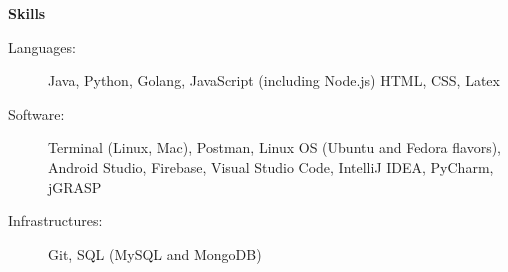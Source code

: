 \documentclass[letterpaper,11pt]{article}
\makeatletter
\newcommand{\resitem}[1]{\item #1 \vspace{-2pt}}
\newcommand{\resheading}[1]{{\large \colorbox{mygrey}{\begin{minipage}{\textwidth}{\textbf{#1 \vphantom{p\^{E}}}}\end{minipage}}}}
\newcommand{\ressubheading}[4]{
\begin{tabular*}{7.0in}{l@{\extracolsep{\fill}}r}
		\textbf{#1} & #2 \\
		\textit{#3} & \textit{#4} \\
\end{tabular*}\vspace{-6pt}}
\makeatother
\begin{document}

\resheading{Skills}

\begin{description}
\item[Languages:] Java, Python, Golang, JavaScript (including Node.js) HTML, CSS, Latex %
\item[Software:] Terminal (Linux, Mac), Postman, Linux OS (Ubuntu and Fedora flavors), Android Studio, Firebase, Visual Studio Code, IntelliJ IDEA, PyCharm, jGRASP
\item[Infrastructures:] Git, SQL (MySQL and MongoDB)
\end{description}
\end{document}
